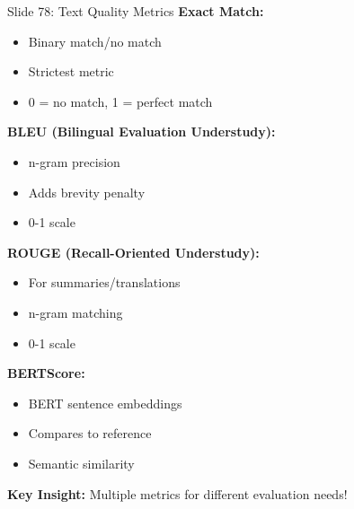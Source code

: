 \documentclass[8pt]{beamer}
\begin{document}
	\begin{frame}{Slide 78: Text Quality Metrics}
		\fontsize{6.5}{7.5}\selectfont
		\textbf{Exact Match:}
		\begin{itemize}
			\item Binary match/no match
			\item Strictest metric
			\item 0 = no match, 1 = perfect match
		\end{itemize}
		
		\vspace{0.1cm}
		\textbf{BLEU (Bilingual Evaluation Understudy):}
		\begin{itemize}
			\item n-gram precision
			\item Adds brevity penalty
			\item 0-1 scale
		\end{itemize}
		
		\vspace{0.1cm}
		\textbf{ROUGE (Recall-Oriented Understudy):}
		\begin{itemize}
			\item For summaries/translations
			\item n-gram matching
			\item 0-1 scale
		\end{itemize}
		
		\vspace{0.1cm}
		\textbf{BERTScore:}
		\begin{itemize}
			\item BERT sentence embeddings
			\item Compares to reference
			\item Semantic similarity
		\end{itemize}
		
		\textcolor{myblue}{\textbf{Key Insight:}} Multiple metrics for different evaluation needs!
	\end{frame}
	
\end{document}
